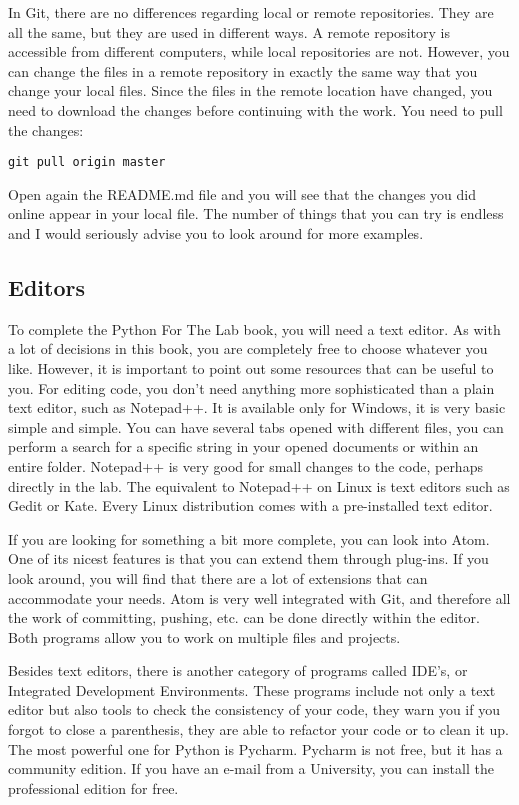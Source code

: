 In Git, there are no differences regarding local or remote repositories. They are all the same, but they are used in different ways. A remote repository is accessible from different computers, while local repositories are not. However, you can change the files in a remote repository in exactly the same way that you change your local files. Since the files in the remote location have changed, you need to download the changes before continuing with the work. You need to pull the changes:

\begin{verbatim}
git pull origin master
\end{verbatim}

Open again the README.md file and you will see that the changes you did online appear in your local file. The number of things that you can try is endless and I would seriously advise you to look around for more examples.


\subsection{Editors}
To complete the Python For The Lab book, you will need a text editor. As with a lot of decisions in this book, you are completely free to choose whatever you like. However, it is important to point out some resources that can be useful to you. For editing code, you don’t need anything more sophisticated than a plain text editor, such as Notepad++. It is available only for Windows, it is very basic simple and simple. You can have several tabs opened with different files, you can perform a search for a specific string in your opened documents or within an entire folder. Notepad++ is very good for small changes to the code, perhaps directly in the lab. The equivalent to Notepad++ on Linux is text editors such as Gedit or Kate. Every Linux distribution comes with a pre-installed text editor.

If you are looking for something a bit more complete, you can look into Atom. One of its nicest features is that you can extend them through plug-ins. If you look around, you will find that there are a lot of extensions that can accommodate your needs. Atom is very well integrated with Git, and therefore all the work of committing, pushing, etc. can be done directly within the editor. Both programs allow you to work on multiple files and projects.

Besides text editors, there is another category of programs called IDE’s, or Integrated Development Environments. These programs include not only a text editor but also tools to check the consistency of your code, they warn you if you forgot to close a parenthesis, they are able to refactor your code or to clean it up. The most powerful one for Python is Pycharm. Pycharm is not free, but it has a community edition. If you have an e-mail from a University, you can install the professional edition for free.

